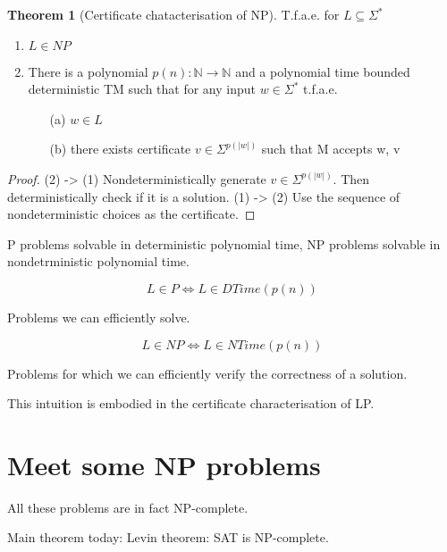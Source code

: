 \documentclass[a4paper,12pt]{article}
\theoremstyle{definition}
\newtheorem{theorem}[counter]{Theorem}
\theoremstyle{remark}
\newcommand{\N}{\mathbb{N}}
\begin{document}
\begin{theorem}[Certificate chatacterisation of NP]
    T.f.a.e. for $L \subseteq \Sigma^*$
    \begin{enumerate}
        \item $L \in NP$
        \item There is a polynomial $p(n): \N \to \N$ and a polynomial time bounded deterministic TM such that for any input $w \in \Sigma^*$ t.f.a.e.
        \begin{itemize}
            \item[(a)] $w \in L$
            \item[(b)] there exists certificate $v \in \Sigma^{p(|w|)}$ such that M accepts w, v
        \end{itemize}
    \end{enumerate}

\end{theorem}

\begin{proof}
    (2) -> (1) Nondeterministically generate $v \in \Sigma^{p(|w|)}$. Then deterministically check if it is a solution.
    (1) -> (2) Use the sequence of nondeterministic choices as the certificate.
\end{proof}






\newpage
P problems solvable in deterministic polynomial time, NP problems solvable in nondetrministic polynomial time.

\begin{equation*}
    L \in P \iff L \in DTime(p(n))
\end{equation*}

Problems we can efficiently solve.

\begin{equation*}
    L \in NP \iff L \in NTime(p(n))
\end{equation*}


Problems for which we can efficiently verify the correctness of a solution.

This intuition is embodied in the certificate characterisation of LP.

\section{Meet some NP problems}
All these problems are in fact NP-complete.

Main theorem today: Levin theorem: SAT is NP-complete.
\end{document}
